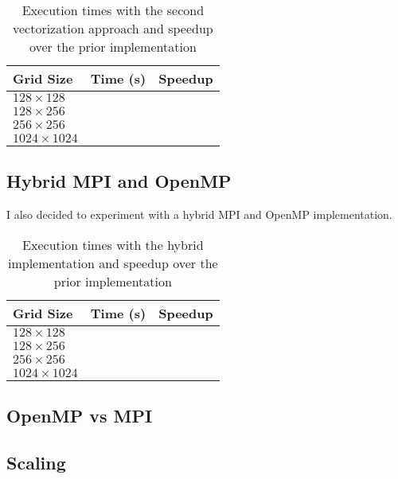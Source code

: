 \documentclass[twocolumn, a4paper]{article}
\begin{document}
\begin{table}[htbp]
  \begin{center}
  \caption{Execution times with the second vectorization approach and speedup over the prior implementation}\label{tab:vectorization_2}
  \begin{tabular}[t]{l | l l} 
      \hline\hline
      Grid Size&Time (s)&Speedup\\
      \hline
      $128 \times 128$&\texttt{}&\texttt{}\\
      $128 \times 256$&\texttt{}&\texttt{}\\
      $256 \times 256$&\texttt{}&\texttt{}\\
      $1024 \times 1024$&\texttt{}&\texttt{}\\
      \hline
    \end{tabular}
  \end{center}
\end{table}

\subsection{Hybrid MPI and OpenMP}

I also decided to experiment with a hybrid MPI and OpenMP implementation.

\begin{table}[htbp]
  \begin{center}
  \caption{Execution times with the hybrid implementation and speedup over the prior implementation}\label{tab:hybrid}
  \begin{tabular}[t]{l | l l} 
      \hline\hline
      Grid Size&Time (s)&Speedup\\
      \hline
      $128 \times 128$&\texttt{}&\texttt{}\\
      $128 \times 256$&\texttt{}&\texttt{}\\
      $256 \times 256$&\texttt{}&\texttt{}\\
      $1024 \times 1024$&\texttt{}&\texttt{}\\
      \hline
    \end{tabular}
  \end{center}
\end{table}

\subsection{OpenMP vs MPI}

\subsection{Scaling}
\end{document}
